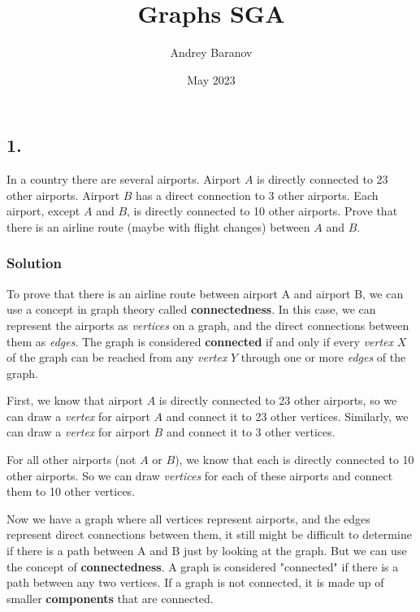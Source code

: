 \documentclass[a4paper]{article}
\title{\vspace{-2cm}Graphs SGA}
\author{Andrey Baranov}
\date{May 2023}
\begin{document}
\maketitle
\subsection*{1.}
In a country there are several airports. Airport \(A\) is directly connected to 23 other airports. Airport \(B\) has a direct connection to 3 other airports. Each airport, except \(A\) and \(B\), is directly connected to 10 other airports. Prove that there is an airline route (maybe with flight changes) between \(A\) and \(B\).
\subsubsection*{Solution}
\par To prove that there is an airline route between airport A and airport B, we can use a concept in graph theory called \textbf{connectedness}. In this case, we can represent the airports as \textit{vertices} on a graph, and the direct connections between them as \textit{edges}. The graph is considered \textbf{connected} if and only if every \textit{vertex} \(X\) of the graph can be reached from any \textit{vertex} \(Y\) through one or more \textit{edges} of the graph. \\
\par
First, we know that airport \(A\) is directly connected to 23 other airports, so we can draw a \textit{vertex} for airport \(A\) and connect it to 23 other vertices. Similarly, we can draw a \textit{vertex} for airport \(B\) and connect it to 3 other vertices. \\
\par
For all other airports (not \(A\) or \(B\)), we know that each is directly connected to 10 other airports. So we can draw \textit{vertices} for each of these airports and connect them to 10 other vertices. \\
\par
Now we have a graph where all vertices represent airports, and the edges represent direct connections between them, it still might be difficult to determine if there is a path between A and B just by looking at the graph.
But we can use the concept of \textbf{connectedness}. A graph is considered "connected" if there is a path between any two vertices. If a graph is not connected, it is made up of smaller \textbf{components} that are connected. \\
\end{document}
